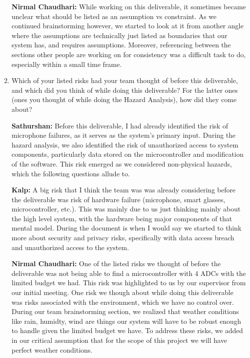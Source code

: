 \documentclass{article}
\begin{document}
\begin{enumerate}
    \textbf{Nirmal Chaudhari:} While working on this deliverable, it sometimes 
    became unclear what should be listed as an assumption vs constraint. As we 
    continued brainstorming however, we started to look at it from another angle 
    where the assumptions are technically just listed as boundaries that our 
    system has, and requires assumptions. Moreover, referencing between the 
    sections other people are working on for consistency was a difficult task 
    to do, especially within a small time frame.  

    \item Which of your listed risks had your team thought of before this
    deliverable, and which did you think of while doing this deliverable? For
    the latter ones (ones you thought of while doing the Hazard Analysis), how
    did they come about?

    \textbf{Sathurshan:} Before this deliverable, I had already identified the
    risk of microphone failures, as it serves as the system's primary input.
    During the hazard analysis, we also identified the risk of unauthorized
    access to system components, particularly data stored on the microcontroller
    and modification of the software. This risk emerged as we considered
    non-physical hazards, which the following questions allude to.

    \textbf{Kalp:} A big risk that I think the team was was already considering
    before the deliverable was risk of hardware failure (microphone, 
    smart glasses, microcontroller, etc.). This was mainly due to us just 
    thinking mainly about the high level system, with the hardware being major
    components of that mental model. During the document is when I would say we
    started to think more about security and privacy risks, specifically with 
    data access breach and unauthorized access to the system.
    
    \textbf{Nirmal Chaudhari:} One of the listed risks we thought of before 
    the deliverable was not being able to find a microcontroller with 4 ADCs 
    with the limited budget we had. This risk was highlighted to us by our 
    supervisor from our initial meeting. One risk we though about while doing 
    this deliverable was risks associated with the environment, which we have 
    no control over. During our team brainstorming section, we realized that 
    weather conditions like rain, humidty, wind are things our system will 
    have to be robust enough to handle given the limited budget we have. 
    To address these risks, we added in our critical assumption that for the 
    scope of this project we will have perfect weather conditions. 


\end{enumerate}
\end{document}
